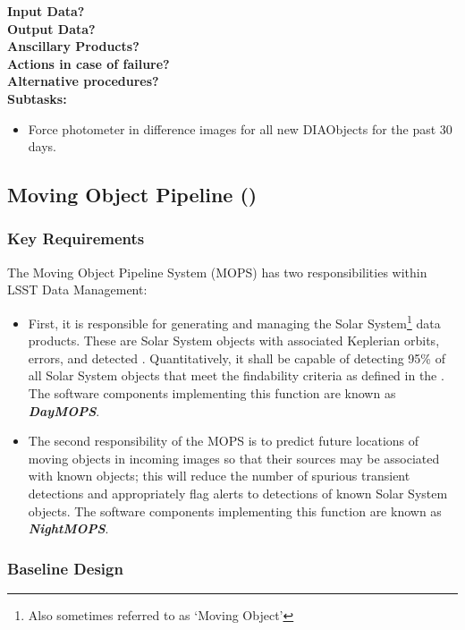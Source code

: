 \noindent
{\bf Input Data?}\\
{\bf Output Data?}\\
{\bf Anscillary Products?}\\
{\bf Actions in case of failure?}\\
{\bf Alternative procedures?}\\

\noindent
{\bf Subtasks:}
\begin{itemize}
\item Force photometer in difference images for all new DIAObjects for the past 30 days.
\end{itemize}
\clearpage

\subsection{Moving Object Pipeline (\wbsMOPS)}

\subsubsection{Key Requirements}

The Moving Object Pipeline System (MOPS) has two responsibilities within LSST Data Management:

\begin{itemize}
    \item First, it is responsible for generating and managing the Solar System\footnote{Also sometimes referred to as `Moving Object'} data products. These are Solar System objects with associated Keplerian orbits, errors, and detected \DIASources. Quantitatively, it shall be capable of detecting 95\% of all Solar System objects that meet the findability criteria as defined in the \OSS\@. The software components implementing this function are known as {\bf \em DayMOPS}.
    \item The second responsibility of the MOPS is to predict future locations of moving objects in incoming images so that their sources may be associated with known objects; this will reduce the number of spurious transient detections and appropriately flag alerts to detections of known Solar System objects.  The software components implementing this function are known as {\bf \em NightMOPS}.
\end{itemize}

\subsubsection{Baseline Design}
